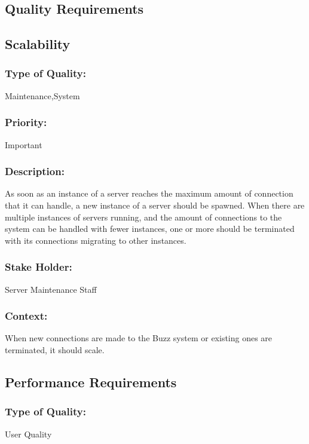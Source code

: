 \documentclass[11pt]{article}
\begin{document}
	\newpage
	\begin{center}
	\section{\textbf{\huge{Quality Requirements}}}
	\end{center}
	\subsection{Scalability}
		\subsubsection{Type of Quality:}
			\textbf{}Maintenance,System
		
		\subsubsection{Priority:}
			\textbf{}Important 
		
		\subsubsection{Description:}
			\textbf{}As soon as an instance of a server reaches the maximum amount of connection that it can handle, a new instance of a server should be spawned. When there are multiple instances of servers running, and the amount of connections to the system can be handled with fewer instances, one or more should be terminated with its connections migrating to other instances.
		
		\subsubsection{Stake Holder:}
			\textbf{}Server Maintenance Staff

		\subsubsection{Context:}
			\textbf{}When new connections are made to the Buzz system or existing ones are terminated, it should scale.
		
	\subsection{Performance Requirements}
		\subsubsection{Type of Quality:}
			\textbf{}User Quality
		
\end{document}
